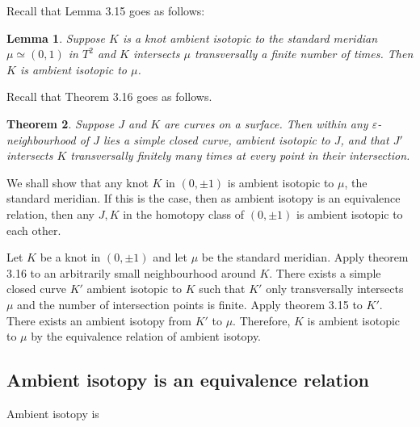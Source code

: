 \documentclass{article}
\newtheorem{theorem}{Theorem}
\newtheorem{lemma}[theorem]{Lemma}
\theoremstyle{definition}
\numberwithin{theorem}{section}
\numberwithin{equation}{section}
\begin{document}
Recall that Lemma 3.15 goes as follows:
\begin{lemma}
    Suppose $K$ is a knot ambient isotopic to the standard meridian $\mu \simeq (0, 1)$ in $T^2$ and $K$ intersects $\mu$ transversally a finite number of times. Then $K$ is ambient isotopic to $\mu$. 
\end{lemma}

Recall that Theorem 3.16 goes as follows.

\begin{theorem}
    Suppose $J$ and $K$ are curves on a surface. Then within any $\varepsilon$-neighbourhood of $J$ lies a simple closed curve, ambient isotopic to $J$, and that $J'$ intersects $K$ transversally finitely many times at every point in their intersection.
\end{theorem}

We shall show that any knot $K$ in $(0, \pm 1)$ is ambient isotopic to $\mu$, the standard meridian. If this is the case, then as ambient isotopy is an equivalence relation, then any $J, K$ in the homotopy class of $(0, \pm 1)$ is ambient isotopic to each other.

Let $K$ be a knot in $(0, \pm 1)$ and let $\mu$ be the standard meridian. Apply theorem 3.16 to an arbitrarily small neighbourhood around $K$. There exists a simple closed curve $K'$ ambient isotopic to $K$ such that $K'$ only transversally intersects $\mu$ and the number of intersection points is finite. Apply theorem 3.15 to $K'$. There exists an ambient isotopy from $K'$ to $\mu$. Therefore, $K$ is ambient isotopic to $\mu$ by the equivalence relation of ambient isotopy.


\subsection{Ambient isotopy is an equivalence relation}
Ambient isotopy is 
\end{document}
